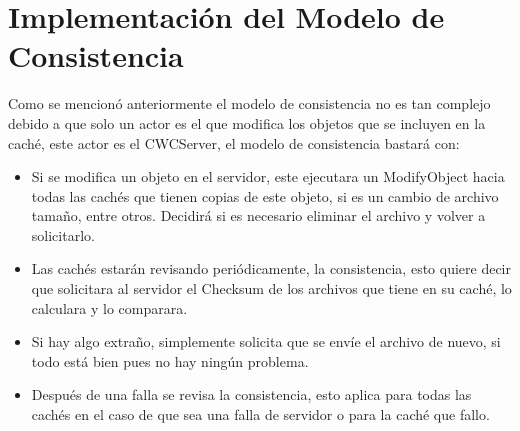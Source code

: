 \section{Implementación del Modelo de Consistencia}
Como se mencionó anteriormente el modelo de consistencia no es tan complejo debido a que solo un actor es el que modifica los objetos que se incluyen en la caché, este actor es el CWCServer, el modelo de consistencia bastará con:

\begin{itemize}
\item Si se modifica un objeto en el servidor, este ejecutara un ModifyObject hacia todas las cachés que tienen copias de este objeto, si es un cambio de archivo tamaño, entre otros. Decidirá si es necesario eliminar el archivo y volver a solicitarlo.
\item Las cachés estarán revisando periódicamente, la consistencia, esto quiere decir que solicitara al servidor el Checksum de los archivos que tiene en su caché, lo calculara y lo comparara.
\item Si hay algo extraño, simplemente solicita que se envíe el archivo de nuevo, si todo está bien pues no hay ningún problema.
\item Después de una falla se revisa la consistencia, esto aplica para todas las cachés en el caso de que sea una falla de servidor o para la caché que fallo.
\end{itemize}